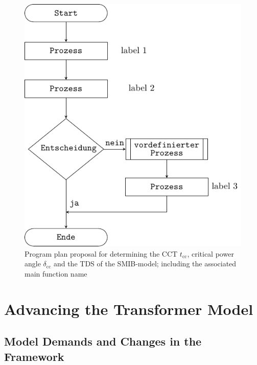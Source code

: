 \begin{figure}[h]
        \centering
        \includegraphics{tikz_graphics/images/programm.pdf}
        \caption[Program plan proposal for determining the \acf{CCT}]{Program plan proposal for determining the \acf{CCT} $t_\mathrm{cc}$, critical power angle $\delta_\mathrm{cc}$ and the \acf{TDS} of the \acf{SMIB}-model; including the associated main function name}
        \label{fig:program-plan}
\end{figure}


\section{Advancing the Transformer Model}


\subsection{Model Demands and Changes in the Framework}

